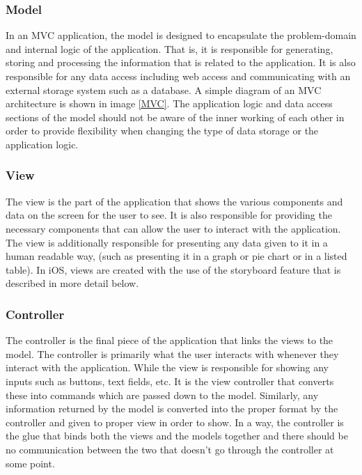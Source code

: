 \documentclass[main.tex]{subfiles}
\begin{document}
\subsubsection{Model}

In an MVC application, the model is designed to encapsulate the problem-domain and internal logic of the application. That is, it is responsible for generating, storing and processing the information that is related to the application. It is also responsible for any data access including web access and communicating with an external storage system such as a database. A simple diagram of an MVC architecture is shown in image \ref{MVC}. The application logic and data access sections of the model should not be aware of the inner working of each other in order to provide flexibility when changing the type of data storage or the application logic. 

\subsubsection{View}

The view is the part of the application that shows the various components and data on the screen for the user to see. It is also responsible for providing the necessary components that can allow the user to interact with the application. The view is additionally responsible for presenting any data given to it in a human readable way, (such as presenting it in a graph or pie chart or in a listed table). In iOS, views are created with the use of the storyboard feature that is described in more detail below.

\subsubsection{Controller}

The controller is the final piece of the application that links the views to the model. The controller is primarily what the user interacts with whenever they interact with the application. While the view is responsible for showing any inputs such as buttons, text fields, etc. It is the view controller that converts these into commands which are passed down to the model. Similarly, any information returned by the model is converted into the proper format by the controller and given to proper view in order to show. In a way, the controller is the glue that binds both the views and the models together and there should be no communication between the two that doesn’t go through the controller at some point.
\end{document}
